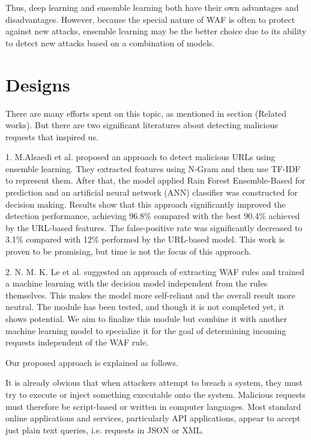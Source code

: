 Thus, deep learning and ensemble learning both have their own advantages and disadvantages. However, because the special nature of WAF is often to protect against new attacks, ensemble learning may be the better choice due to its ability to detect new attacks based on a combination of models.

\section{Designs}
\label{design}
\hspace{0.5cm}There are many efforts spent on this topic, as mentioned in section (Related works). But there are two significant literatures about detecting malicious requests that inspired us. 

1. M.Alsaedi et al.\cite{s22093373} proposed an approach to detect malicious URLs using ensemble learning. They extracted features using N-Gram and then use TF-IDF to represent them. After that, the model applied Rain Forest Ensemble-Based for prediction and an artificial neural network (ANN) classifier was constructed for decision making. Results show that this approach significantly improved the detection performance, achieving 96.8\% compared with the best 90.4\% achieved by the URL-based features. The false-positive rate was significantly decreased to 3.1\% compared with 12\% performed by the URL-based model. This work is proven to be promising, but time is not the focus of this approach. 

2. N. M. K. Le et al.\cite{Khoi} suggested an approach of extracting WAF rules and trained a machine learning with the decision model independent from the rules themselves. This makes the model more self-reliant and the overall result more neutral. The module has been tested, and though it is not completed yet, it shows potential. We aim to finalize this module but combine it with another machine learning model to specialize it for the goal of determining incoming requests independent of the WAF rule.

Our proposed approach is explained as follows.

It is already obvious that when attackers attempt to breach a system, they must try to execute or inject something executable onto the system. Malicious requests must therefore be script-based or written in computer languages. Most standard online applications and services, particularly API applications, appear to accept just plain text queries, i.e. requests in JSON or XML. 

